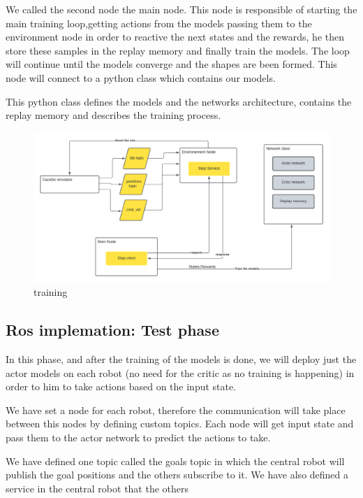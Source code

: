 \documentclass[12pt]{extarticle}
\begin{document}
We called the second node the main node. This node is responsible of starting the main training loop,getting actions from the models passing them to the environment node in order to reactive the next states and the rewards, he then store these samples in the replay memory and finally train the models.
The loop will continue until the models converge and the shapes are been formed. This node will connect to a python class which contains our models.


This python class defines the models and the networks architecture, contains the replay memory and describes the training process.  

 \begin{figure}[h]  
\centering
\includegraphics[scale=0.6]{training}
\caption[training phase]{training}
\end{figure}

\pagebreak

\subsection{Ros implemation: Test phase}
In this phase, and after the training of the models is done, we will deploy  just the actor models on each robot (no need for the critic as no training is happening)  in order to him to take actions based on the input state.

We have set a node for each robot, therefore the communication will take place  between this nodes by defining custom topics. Each node will get input state and pass them to the actor network to predict the actions to take.

We have defined one topic called the goals topic in which the central robot will publish the goal positions and the others subscribe to it. We have also defined a service in the central robot that the others 
\end{document}
